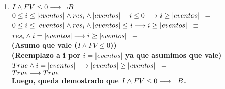 \documentclass[10pt,a4paper]{article}
\begin{document}
\begin{flushleft}
\begin{enumerate}
	\item \textbf{$I \wedge FV\leq0 \longrightarrow \neg B$} \\
	\vspace{2mm}
	$0\leq i \leq |eventos| \wedge res_i \wedge |eventos|-i \leq 0 \longrightarrow i \geq |eventos|$ $\equiv$ \\
	\vspace{2mm}
	$0\leq i \leq |eventos| \wedge res_i \wedge |eventos| \leq i \longrightarrow i \geq |eventos|$ $\equiv$ \\
	\vspace{2mm}
	$ res_i \wedge i= |eventos| \longrightarrow i \geq |eventos|$ $\equiv$ \\
	\vspace{2mm}
	\textbf{(Asumo que vale ($I \wedge FV\leq0$)) }\\
	\vspace{2mm}
	\textbf{(Reemplazo a i por $i=|eventos|$ ya que asumimos que vale)}\\
	\vspace{2mm}
	$True \wedge i=|eventos| \longrightarrow |eventos| \geq |eventos|$ $\equiv$ \\
	$True  \longrightarrow  True$ \\
	\vspace{3mm}
	\textbf{Luego, queda demostrado que $I \wedge FV\leq0 \longrightarrow \neg B$.}
	
	
	


\end{enumerate}


\end{flushleft}
\end{document}
